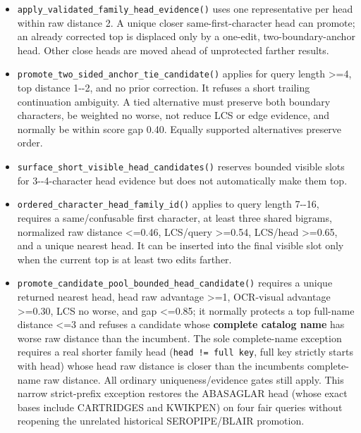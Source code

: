 \begin{itemize}
\tightlist
\item
  \texttt{apply\_\allowbreak{}validated\_\allowbreak{}family\_\allowbreak{}head\_\allowbreak{}evidence()} uses one representative per head within raw distance 2. A unique closer same-first-character head can promote; an already corrected top is displaced only by a one-edit, two-boundary-anchor head. Other close heads are moved ahead of unprotected farther results.
\item
  \texttt{promote\_\allowbreak{}two\_\allowbreak{}sided\_\allowbreak{}anchor\_\allowbreak{}tie\_\allowbreak{}candidate()} applies for query length \textgreater=4, top distance 1-\/-2, and no prior correction. It refuses a short trailing continuation ambiguity. A tied alternative must preserve both boundary characters, be weighted no worse, not reduce LCS or edge evidence, and normally be within score gap 0.40. Equally supported alternatives preserve order.
\item
  \texttt{surface\_\allowbreak{}short\_\allowbreak{}visible\_\allowbreak{}head\_\allowbreak{}candidates()} reserves bounded visible slots for 3-\/-4-character head evidence but does not automatically make them top.
\item
  \texttt{ordered\_\allowbreak{}character\_\allowbreak{}head\_\allowbreak{}family\_\allowbreak{}id()} applies to query length 7-\/-16, requires a same/confusable first character, at least three shared bigrams, normalized raw distance \textless=0.46, LCS/query \textgreater=0.54, LCS/head \textgreater=0.65, and a unique nearest head. It can be inserted into the final visible slot only when the current top is at least two edits farther.
\item
  \texttt{promote\_\allowbreak{}candidate\_\allowbreak{}pool\_\allowbreak{}bounded\_\allowbreak{}head\_\allowbreak{}candidate()} requires a unique returned nearest head, head raw advantage \textgreater=1, OCR-visual advantage \textgreater=0.30, LCS no worse, and gap \textless=0.85; it normally protects a top full-name distance \textless=3 and refuses a candidate whose \textbf{complete catalog name} has worse raw distance than the incumbent. The sole complete-name exception requires a real shorter family head (\texttt{head\ !=\ full\ key}, full key strictly starts with head) whose head raw distance is closer than the incumbent\textquotesingle s complete-name raw distance. All ordinary uniqueness/evidence gates still apply. This narrow strict-prefix exception restores the ABASAGLAR head (whose exact bases include CARTRIDGES and KWIKPEN) on four fair queries without reopening the unrelated historical SEROPIPE/BLAIR promotion.

\end{itemize}
